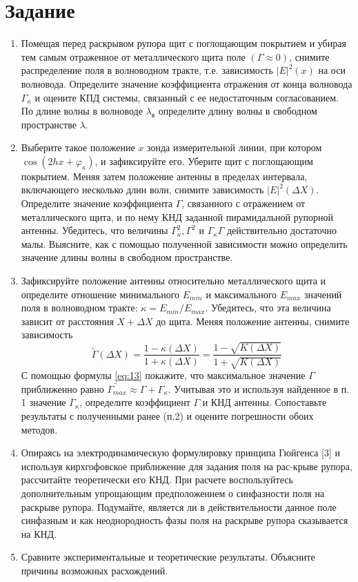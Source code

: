 \section{Задание}
\begin{enumerate}
    \item Помещая перед раскрывом рупора щит с поглощающим покрытием и убирая тем самым отраженное от металлического 
    щита поле $(\Gamma \approx 0)$, снимите распределение поля в волноводном тракте, т.е. зависимость $|E|^2(x)$ на оси волновода. 
    Определите значение коэффициента отражения от конца волновода $\Gamma_{\kappa}$ и оцените КПД системы, связанный с ее 
    недостаточным согласованием. По длине волны в волноводе $\lambda_{\text{в}}$ определите длину волны в свободном пространстве $\lambda$.
    \item Выберите такое положение $x$ зонда измерительной линии, при котором $\cos (2 h x +\varphi_{\kappa})$, и зафиксируйте его. 
    Уберите щит с поглощающим покрытием. Меняя затем положение антенны в пределах интервала, включающего несколько длин 
    волн, снимите зависимость $|E|^2(\Delta X)$. Определите значение коэффициента $\Gamma$, связанного с отражением от металлического 
    щита, и по нему КНД заданной пирамидальной рупорной антенны. Убедитесь, что величины $\Gamma_{\kappa}^2,\Gamma^2 $ и
    $\Gamma_{\kappa} \Gamma$ действительно достаточно малы. Выясните, как с помощью полученной зависимости можно 
    определить значение длины волны в свободном пространстве.
    \item Зафиксируйте положение антенны относительно металлического щита и определите отношение минимального $E_{min}$ 
    и максимального  $E_{max}$  значений поля в волноводном тракте: $\kappa = E_{min}/E_{max}$. Убедитесь, что эта 
    величина зависит от расстояния $X+\Delta X$ до щита. Меняя положение антенны, снимите зависимость
    $$ \tilde{\Gamma}(\Delta X)= \frac{1-\kappa (\Delta X)}{1+\kappa (\Delta X)} = \frac{1-\sqrt{K(\Delta X)}}{1+\sqrt{K(\Delta X)}} $$
    С помощью формулы \ref{eq:13} покажите, что максимальное значение $\Gamma$ приближенно равно $\tilde{\Gamma_{max}}
    \approx \Gamma + \Gamma_{\kappa}$. Учитывая это и используя найденное в п. 1 значение $\Gamma_{\kappa}$, определите 
    коэффициент $\Gamma$ и КНД антенны. Сопоставьте результаты с полученными ранее (п.2) и оцените погрешности обоих
    методов.
    \item Опираясь на электродинамическую формулировку принципа Гюйгенса [3] и используя кирхгофовское приближение для 
    задания поля на рас-крыве рупора, рассчитайте теоретически его КНД. При расчете воспользуйтесь дополнительным 
    упрощающим предположением о синфазности поля на раскрыве рупора. Подумайте, является ли в действительности данное 
    поле синфазным и как неоднородность фазы поля на раскрыве рупора сказывается на КНД.
    \item Сравните экспериментальные и теоретические результаты. Объясните причины возможных расхождений.
\end{enumerate}

